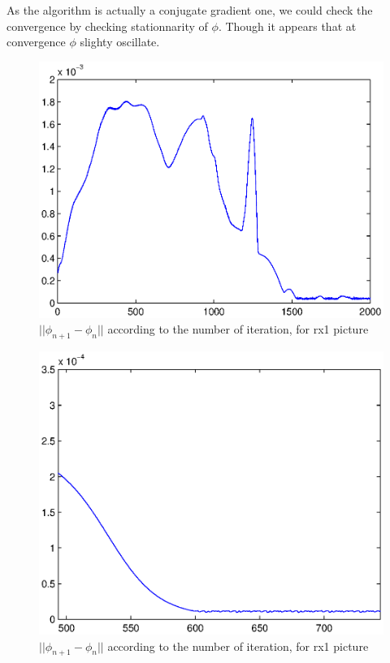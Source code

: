 As the algorithm is actually a conjugate gradient one, we could check the convergence by checking stationnarity of $\phi$.
Though it appears that at convergence $\phi$ slighty oscillate.

\begin{figure}[H]
\centering
\includegraphics[scale=0.7]{images/crit_it_rx1_t1.eps}
\caption{$||{\phi_{n+1}-\phi_n}||$ according to the number of iteration, for rx1 picture}
\label{fig1}
\end{figure}

\begin{figure}[H]
\centering
\includegraphics[scale=0.7]{images/crit_it_rx2_t1_zoom.eps}
\caption{$||{\phi_{n+1}-\phi_n}||$ according to the number of iteration, for rx1 picture}
\label{fig2}
\end{figure}

